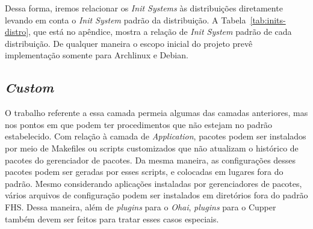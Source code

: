 Dessa forma, iremos relacionar os \textit{Init Systems} às distribuições
diretamente levando em conta o \textit{Init System} padrão da distribuição.
A Tabela~\ref{tab:inits-distro}, que está no apêndice, 
mostra a relação de \textit{Init System} padrão de cada 
distribuição. De qualquer maneira o escopo inicial do projeto prevê
implementação somente para Archlinux e Debian.

\subsection{\textit{Custom}}
\label{sec:camada-custom}

O trabalho referente a essa camada permeia algumas das camadas anteriores, mas
nos pontos em que podem ter procedimentos que não estejam no padrão estabelecido.
Com relação à camada de \textit{Application}, pacotes podem ser instalados por
meio de Makefiles ou scripts customizados que não atualizam o histórico de
pacotes do gerenciador de pacotes. Da mesma maneira, as configurações desses
pacotes podem ser geradas por esses scripts, e colocadas em lugares fora do padrão.
Mesmo considerando aplicações instaladas por gerenciadores de pacotes, vários
arquivos de configuração podem ser instalados em diretórios fora  do padrão FHS.
Dessa maneira, além de \textit{plugins} para o \textit{Ohai}, \textit{plugins}
para o Cupper também devem ser feitos para tratar esses casos especiais.

